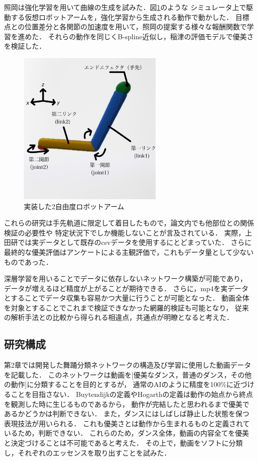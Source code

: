 照岡\cite{teruoka}は強化学習を用いて曲線の生成を試みた．図\ref{robot_arm}のような
シミュレータ上で駆動する仮想ロボットアームを，強化学習から生成される動作で動かした．
目標点との位置差分と各関節の加速度を用いて，照岡の提案する様々な報酬関数で学習を進めた．
それらの動作を同じくB-spline近似し，稲津の評価モデルで優美さを検証した．

\begin{figure}[b]
  \begin{center}
    \includegraphics[width=70mm]{images/quote/robot_arm.png}
  \end{center}
  \caption{実装した2自由度ロボットアーム}
  \label{robot_arm}
\end{figure}
\clearpage

これらの研究は手先軌道に限定して着目したもので，論文内でも他部位との関係検証の必要性や
特定状況下でしか機能しないことが言及されている．
実際，上田研では実データとして既存のcsvデータを使用するにとどまっていた．
さらに最終的な優美評価はアンケートによる主観評価で，これもデータ量として少ないものであった．

深層学習を用いることでデータに依存しないネットワーク構築が可能であり，
データが増えるほど精度が上がることが期待できる．
さらに，mp4を実データとすることでデータ収集も容易かつ大量に行うことが可能となった．
動画全体を対象とすることでこれまで検証できなかった網羅的検証も可能となり，
従来の解析手法との比較から得られる相違点，共通点が明瞭となると考えた．

\subsection{研究構成}
第2章では開発した舞踊分類ネットワークの構造及び学習に使用した動画データを記載した．
このネットワークは動画を[優美なダンス，普通のダンス，その他の動作]に分類することを目的とするが，
通常のAIのように精度を100\%に近づけることを目指さない．
Buytendijkの定義やHogarthの定義は動作の始点から終点を観測した時に生じるものであるから，
動作が完結したと思われるまで優美であるかどうかは判断できない．
また，ダンスにはしばしば静止した状態を保つ表現技法が用いられる．
これも優美さとは動作から生まれるものと定義されているため，判断できない．
これらのため，ダンス全体，動画の内容全てを優美と決定づけることは不可能であると考えた．
その上で，動画をソフトに分類し，それぞれのエッセンスを取り出すことを試みた．

